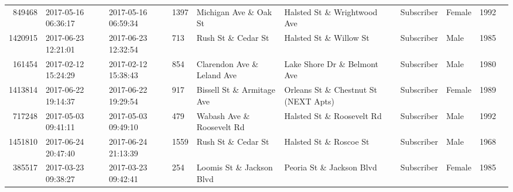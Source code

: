 \documentclass[11pt]{article}
\begin{document}
\begin{description}
\begin{tabular}{r|lllllllll}
	  849468                                & 2017-05-16 06:36:17                    & 2017-05-16 06:59:34                    & 1397                                   & Michigan Ave \& Oak St                & Halsted St \& Wrightwood Ave          & Subscriber                             & Female                                 & 1992                                  \\
	 1420915                                & 2017-06-23 12:21:01                    & 2017-06-23 12:32:54                    &  713                                   & Rush St \& Cedar St                   & Halsted St \& Willow St               & Subscriber                             & Male                                   & 1985                                  \\
	  161454                                & 2017-02-12 15:24:29                    & 2017-02-12 15:38:43                    &  854                                   & Clarendon Ave \& Leland Ave           & Lake Shore Dr \& Belmont Ave          & Subscriber                             & Male                                   & 1980                                  \\
	 1413814                                & 2017-06-22 19:14:37                    & 2017-06-22 19:29:54                    &  917                                   & Bissell St \& Armitage Ave            & Orleans St \& Chestnut St (NEXT Apts) & Subscriber                             & Female                                 & 1989                                  \\
	  717248                                & 2017-05-03 09:41:11                    & 2017-05-03 09:49:10                    &  479                                   & Wabash Ave \& Roosevelt Rd            & Halsted St \& Roosevelt Rd            & Subscriber                             & Male                                   & 1992                                  \\
	 1451810                                & 2017-06-24 20:47:40                    & 2017-06-24 21:13:39                    & 1559                                   & Rush St \& Cedar St                   & Halsted St \& Roscoe St               & Subscriber                             & Male                                   & 1968                                  \\
	  385517                                & 2017-03-23 09:38:27                    & 2017-03-23 09:42:41                    &  254                                   & Loomis St \& Jackson Blvd             & Peoria St \& Jackson Blvd             & Subscriber                             & Female                                 & 1985                                  \\

\end{tabular}
\end{description}
\end{document}
